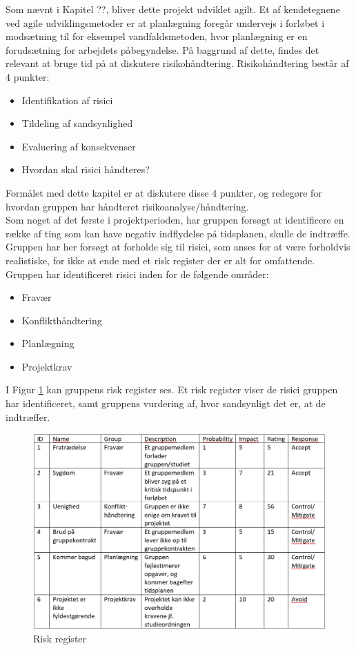 Som nævnt i Kapitel ??, bliver dette projekt udviklet agilt. Et af kendetegnene ved agile udviklingsmetoder er at 
planlægning foregår undervejs i forløbet i modsætning til for eksempel vandfaldsmetoden, hvor planlægning er en 
forudsætning for arbejdets påbegyndelse. På baggrund af dette, findes det relevant at bruge tid på at diskutere 
risikohåndtering. Risikohåndtering består af 4 punkter:

\begin{itemize}
    \item Identifikation af risici
    \item Tildeling af sandsynlighed
    \item Evaluering af konsekvenser
    \item Hvordan skal risici håndteres?
\end{itemize}

Formålet med dette kapitel er at diskutere disse 4 punkter, og redegøre for hvordan gruppen har håndteret risikoanalyse/håndtering. \\ 

Som noget af det første i projektperioden, har gruppen forsøgt at identificere en række af ting som kan have negativ indflydelse
på tidsplanen, skulle de indtræffe. Gruppen har her forsøgt at forholde sig til risici, som anses for at være forholdvis realistiske, for ikke
at ende med et risk register der er alt for omfattende. Gruppen har identificeret risici inden for de følgende områder:

\begin{itemize}
    \item Fravær
    \item Konflikthåndtering
    \item Planlægning
    \item Projektkrav
\end{itemize}

I Figur \ref{fig:riskregister} kan gruppens risk register ses. Et risk register viser de risici gruppen har identificeret, samt gruppens vurdering af, hvor sandsynligt det er, at de indtræffer.

\begin{figure}[!h]
    \centering
    \includegraphics[width=\textwidth]{figures/RiskRegister.png}
    \caption{Risk register}
    \label{fig:riskregister}
\end{figure}

